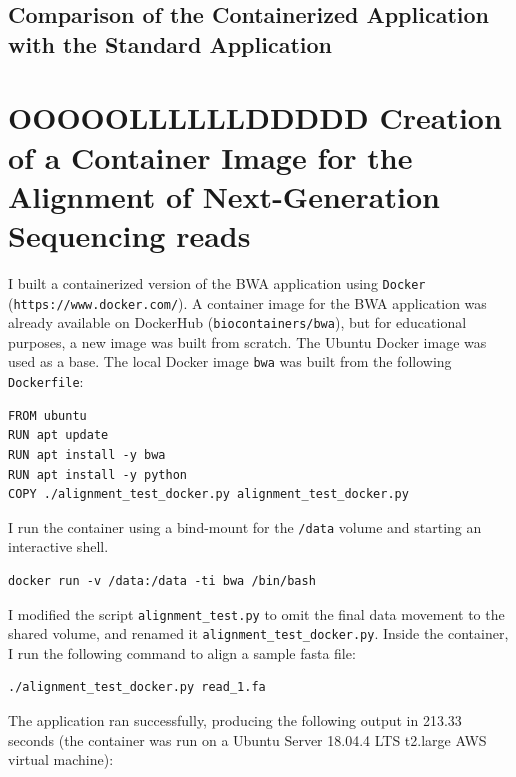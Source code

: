 \documentclass{article}
\begin{document}
\subsection{Comparison of the Containerized Application with the Standard Application}





\section{OOOOOLLLLLLDDDDD Creation of a Container Image for the Alignment of Next-Generation Sequencing reads}
I built a containerized version of the BWA application using \texttt{Docker} (\texttt{https://www.docker.com/}).
A container image for the BWA application was already available on DockerHub (\texttt{biocontainers/bwa}), but for educational purposes, a new image was built from scratch.
The Ubuntu Docker image was used as a base.
The local Docker image \texttt{bwa} was built from the following \texttt{Dockerfile}:

\begin{lstlisting}
FROM ubuntu
RUN apt update
RUN apt install -y bwa
RUN apt install -y python
COPY ./alignment_test_docker.py alignment_test_docker.py
\end{lstlisting}

I run the container using a bind-mount for the \texttt{/data} volume and starting an interactive shell.

\begin{lstlisting}
docker run -v /data:/data -ti bwa /bin/bash
\end{lstlisting}

I modified the script \texttt{alignment\_test.py} to omit the final data movement to the shared volume, and renamed it \texttt{alignment\_test\_docker.py}.
Inside the container, I run the following command to align a sample fasta file:

\begin{lstlisting}
./alignment_test_docker.py read_1.fa
\end{lstlisting}

The application ran successfully, producing the following output in 213.33 seconds (the container was run on a Ubuntu Server 18.04.4 LTS t2.large AWS virtual machine):
\end{document}
